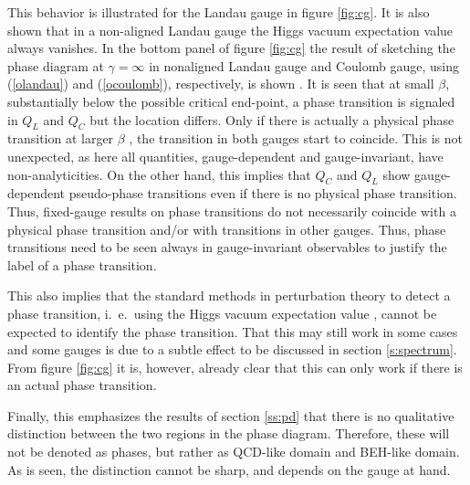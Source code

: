 \documentclass[final,twoside,12pt]{article}
\newcommand*{\pref}[1]{(\ref{#1})}
\newcommand*{\1}{1\!\!\!\bot}
\begin{document}
This behavior is illustrated for the Landau gauge in figure \ref{fig:cg}. It is also shown that in a non-aligned Landau gauge the Higgs vacuum expectation value always vanishes. In the bottom panel of figure \ref{fig:cg} the result of sketching the phase diagram at $\gamma=\infty$ in nonaligned Landau gauge and Coulomb gauge, using \pref{olandau} and \pref{ocoulomb}, respectively, is shown \cite{Caudy:2007sf}. It is seen that at small $\beta$, substantially below the possible critical end-point, a phase transition is signaled in $Q_L$ and $Q_C$ but the location differs. Only if there is actually a physical phase transition at larger $\beta$ \cite{Bonati:2009pf,Bonati:2009yi}, the transition in both gauges start to coincide. This is not unexpected, as here all quantities, gauge-dependent and gauge-invariant, have non-analyticities. On the other hand, this implies that $Q_C$ and $Q_L$ show gauge-dependent pseudo-phase transitions even if there is no physical phase transition. Thus, fixed-gauge results on phase transitions do not necessarily coincide with a physical phase transition and/or with transitions in other gauges. Thus, phase transitions need to be seen always in gauge-invariant observables to justify the label of a phase transition.

This also implies that the standard methods in perturbation theory to detect a phase transition, i.\ e.\ using the Higgs vacuum expectation value \cite{Kapusta:2006pm}, cannot be expected to identify the phase transition. That this may still work in some cases and some gauges is due to a subtle effect to be discussed in section \ref{s:spectrum}. From figure \ref{fig:cg} it is, however, already clear that this can only work if there is an actual phase transition.

Finally, this emphasizes the results of section \ref{ss:pd} that there is no qualitative distinction between the two regions in the phase diagram. Therefore, these will not be denoted as phases, but rather as QCD-like domain and BEH-like domain. As is seen, the distinction cannot be sharp, and depends on the gauge at hand.
\end{document}
